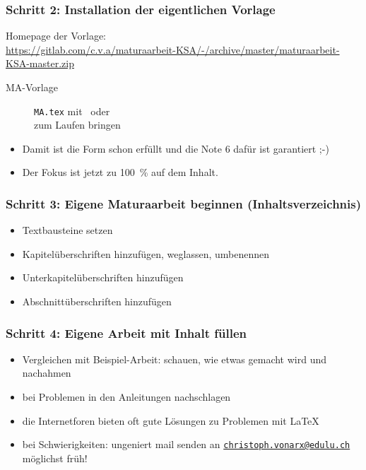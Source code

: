 \documentclass[11pt,german,aspectratio=169]{beamer}
\def\myColor{blue!80!white!70!green}                %
\newcommand{\thisColor}[1]{{\color{\myColor}#1}}    %
\newcommand{\smallurl}[1]{{\scriptsize{\url{#1}}}}
\begin{document}
{
	\frametitle{Schritt 2: Installation der eigentlichen Vorlage}
	
	
	Homepage der Vorlage: \\
	\smallurl{https://gitlab.com/c.v.a/maturaarbeit-KSA/-/archive/master/maturaarbeit-KSA-master.zip}
	
			\begin{description}
 				\item[MA-Vorlage] {\tt{MA.tex}} mit \thisColor{\XeTeX}\ oder \thisColor{\XeLaTeX}\\ zum Laufen bringen
			\end{description}
	\begin{itemize}
		\item Damit ist die Form schon erfüllt und die Note 6 dafür ist garantiert ;-)
		\item Der Fokus ist jetzt zu \SI{100}{\percent} auf dem Inhalt.
	\end{itemize}
}

\frame
{
	\frametitle{Schritt 3: Eigene Maturaarbeit beginnen (Inhaltsverzeichnis)}
	
		\begin{itemize}
			\item Textbausteine setzen
	
			
			\item Kapitelüberschriften hinzufügen, weglassen, umbenennen \\
	
			\item Unterkapitelüberschriften hinzufügen \\
	
			\item Abschnittüberschriften hinzufügen \\
	
		\end{itemize}
	
}
\frame
{
	\frametitle{Schritt 4: Eigene Arbeit mit Inhalt füllen}
	\begin{itemize}
		\item Vergleichen mit Beispiel-Arbeit: schauen, wie etwas gemacht wird und nachahmen
		\item bei Problemen in den Anleitungen nachschlagen
		\item die Internetforen bieten oft gute Lösungen zu Problemen mit \LaTeX
		\item bei Schwierigkeiten: ungeniert mail senden an \href{mailto:christoph.vonarx@edulu.ch}{\tt{christoph.vonarx@edulu.ch}}\\
		{\color{green!80!white!70!black} möglichst früh!}
		
	\end{itemize}
	
}
\end{document}
